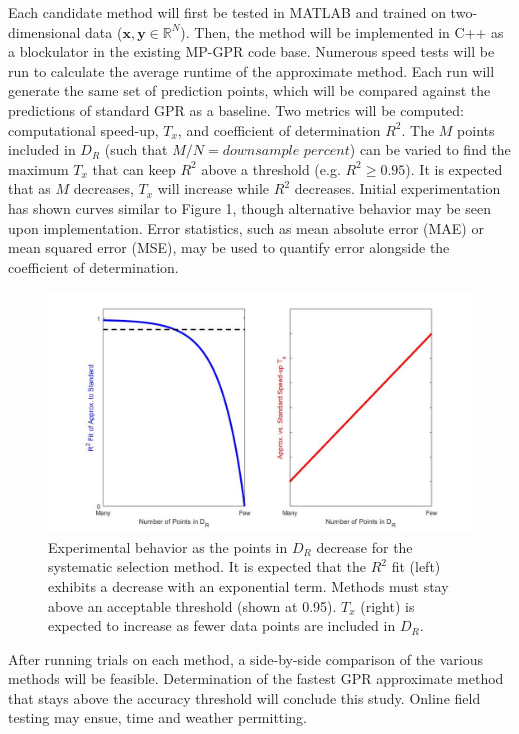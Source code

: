 \documentclass{article}
\begin{document}
Each candidate method will first be tested in MATLAB and trained on two-dimensional data ($\boldsymbol{x},\boldsymbol{y}\in\mathbb{R}^{N}$). Then, the method will be implemented in C++ as a blockulator in the existing MP-GPR code base. Numerous speed tests will be run to calculate the average runtime of the approximate method. Each run will generate the same set of prediction points, which will be compared against the predictions of standard GPR as a baseline. Two metrics will be computed: computational speed-up, $T_x$, and coefficient of determination $R^2$. The $M$ points included in $D_R$ (such that $M/N = \textit{downsample percent}$) can be varied to find the maximum $T_x$ that can keep $R^2$ above a threshold (e.g. $R^2 \geq 0.95$). It is expected that as $M$ decreases, $T_x$ will increase while $R^2$ decreases. Initial experimentation has shown curves similar to Figure 1, though alternative behavior may be seen upon implementation. Error statistics, such as mean absolute error (MAE) or mean squared error (MSE), may be used to quantify error alongside the coefficient of determination. 

\begin{figure}[htp]
    \centering
    \includegraphics[width=12cm]{TheoreticalSpeedup_R2_forThesisProposal_general.jpg} %
    \caption[Expected Speed-up]{Experimental behavior as the points in $D_R$ decrease for the systematic selection method. It is expected that the $R^2$ fit (left) exhibits a decrease with an exponential term. Methods must stay above an acceptable threshold (shown at 0.95). $T_x$ (right) is expected to increase as fewer data points are included in $D_R$.}
    \label{fig: mc} %
\end{figure}

After running trials on each method, a side-by-side comparison of the various methods will be feasible.  Determination of the fastest GPR approximate method that stays above the accuracy threshold will conclude this study.  Online field testing may ensue, time and weather permitting. 
\end{document}
